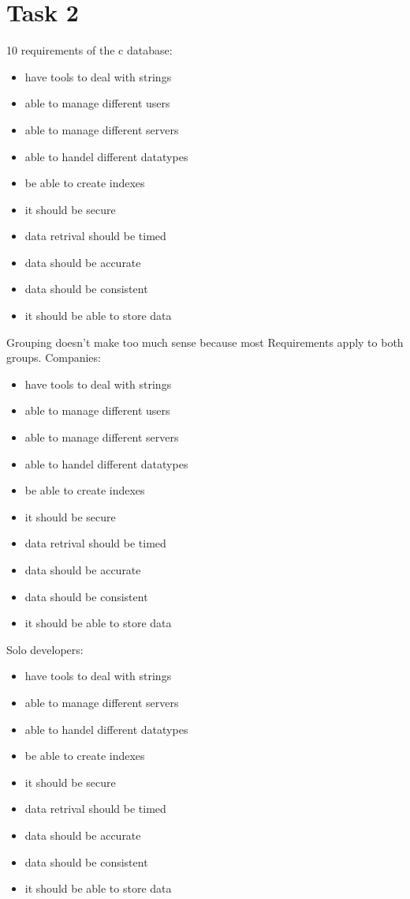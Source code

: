 \chapter{Task 2}
\begin{elenco}
\item 10 requirements of the c database:
\begin{itemize}
	\item have tools to deal with strings
	\item able to manage different users
    \item able to manage different servers
    \item able to handel different datatypes
    \item be able to create indexes
    \item it should be secure
    \item data retrival should be timed
    \item data should be accurate
    \item data should be consistent
    \item it should be able to store data
\end{itemize} 

\item Grouping doesn't make too much sense because most Requirements apply to both groups.
Companies:
\begin{itemize}
    \item have tools to deal with strings
    \item able to manage different users
    \item able to manage different servers
    \item able to handel different datatypes
    \item be able to create indexes
    \item it should be secure
    \item data retrival should be timed
    \item data should be accurate
    \item data should be consistent
    \item it should be able to store data
\end{itemize}
Solo developers:
\begin{itemize}
    \item have tools to deal with strings
    \item able to manage different servers
    \item able to handel different datatypes
    \item be able to create indexes
    \item it should be secure
    \item data retrival should be timed
    \item data should be accurate
    \item data should be consistent
    \item it should be able to store data
\end{itemize}


\end{elenco}
